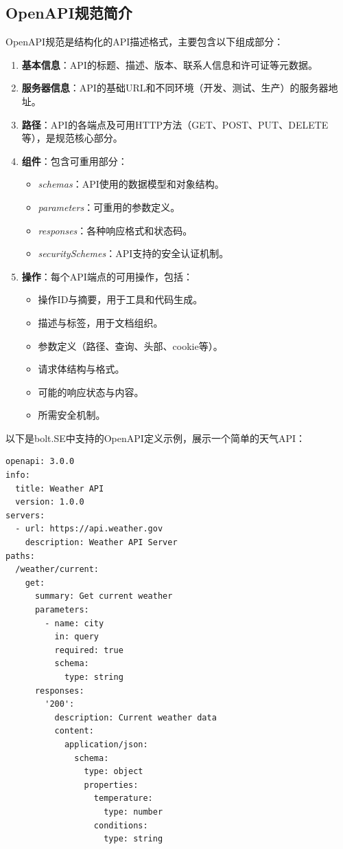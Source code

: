 \subsection{OpenAPI规范简介}
OpenAPI规范是结构化的API描述格式，主要包含以下组成部分\cite{openapi2023spec}：

\begin{enumerate}
  \item \textbf{基本信息}：API的标题、描述、版本、联系人信息和许可证等元数据。
  
  \item \textbf{服务器信息}：API的基础URL和不同环境（开发、测试、生产）的服务器地址。
  
  \item \textbf{路径}：API的各端点及可用HTTP方法（GET、POST、PUT、DELETE等），是规范核心部分。
  
  \item \textbf{组件}：包含可重用部分：
    \begin{itemize}
      \item \textit{schemas}：API使用的数据模型和对象结构。
      \item \textit{parameters}：可重用的参数定义。
      \item \textit{responses}：各种响应格式和状态码。
      \item \textit{securitySchemes}：API支持的安全认证机制。
    \end{itemize}
  
  \item \textbf{操作}：每个API端点的可用操作，包括：
    \begin{itemize}
      \item 操作ID与摘要，用于工具和代码生成。
      \item 描述与标签，用于文档组织。
      \item 参数定义（路径、查询、头部、cookie等）。
      \item 请求体结构与格式。
      \item 可能的响应状态与内容。
      \item 所需安全机制。
    \end{itemize}
\end{enumerate}

以下是bolt.SE中支持的OpenAPI定义示例，展示一个简单的天气API：

\begin{verbatim}
openapi: 3.0.0
info:
  title: Weather API
  version: 1.0.0
servers:
  - url: https://api.weather.gov
    description: Weather API Server
paths:
  /weather/current:
    get:
      summary: Get current weather
      parameters:
        - name: city
          in: query
          required: true
          schema:
            type: string
      responses:
        '200':
          description: Current weather data
          content:
            application/json:
              schema:
                type: object
                properties:
                  temperature:
                    type: number
                  conditions:
                    type: string
\end{verbatim}

